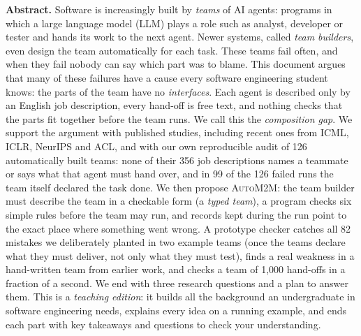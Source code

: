 \documentclass[10pt,a4paper]{article}
\newcommand{\auto}{\textsc{AutoM2M}}
\begin{document}
\begin{tcolorbox}[enhanced, colback=accentlight, colframe=accentlight, arc=0pt,
   boxrule=0pt, borderline west={2.2pt}{0pt}{accent}, left=10pt, right=10pt,
   top=7pt, bottom=7pt]
{\sffamily\bfseries\color{accent}Abstract.}\enspace
Software is increasingly built by \emph{teams} of AI agents: programs in
which a large language model (LLM) plays a role such as analyst, developer
or tester and hands its work to the next agent. Newer systems, called
\emph{team builders}, even design the team automatically for each task.
These teams fail often, and when they fail nobody can say which part was
to blame. This document argues that many of these failures have a cause
every software engineering student knows: the parts of the team have no
\emph{interfaces}. Each agent is described only by an English job
description, every hand-off is free text, and nothing checks that the
parts fit together before the team runs. We call this the
\emph{composition gap}. We support the argument with published studies,
including recent ones from ICML, ICLR, NeurIPS and ACL, and with our own
reproducible audit of 126 automatically built teams: none of their 356 job
descriptions names a teammate or says what that agent must hand over, and
in 99 of the 126 failed runs the team itself declared the task done. We
then propose \auto{}: the team builder must describe the team in a
checkable form (a \emph{typed team}), a program checks six simple rules
before the team may run, and records kept during the run point to the
exact place where something went wrong. A prototype checker catches all
82 mistakes we deliberately planted in two example teams (once the teams
declare what they must deliver, not only what they must test), finds a real
weakness in a hand-written team from earlier work, and checks a team of
1{,}000 hand-offs in a fraction of a second. We end with three research
questions and a plan to answer them. This is a \emph{teaching edition}:
it builds all the background an undergraduate in software engineering
needs, explains every idea on a running example, and ends each part with
key takeaways and questions to check your understanding.
\end{tcolorbox}

{\hypersetup{linkcolor=black}
\setcounter{tocdepth}{1}
\makeatletter
\renewcommand*\l@section[2]{\addpenalty{-\@highpenalty}\vskip 0.15em
  {\sffamily\small\@dottedtocline{1}{0em}{2em}{#1}{#2}}}
\renewcommand*\l@subsection[2]{\small\@dottedtocline{2}{2em}{2.6em}{#1}{#2}}
\makeatother
\renewcommand{\contentsname}{\sffamily\color{accent}Contents}
\tableofcontents}
\end{document}
